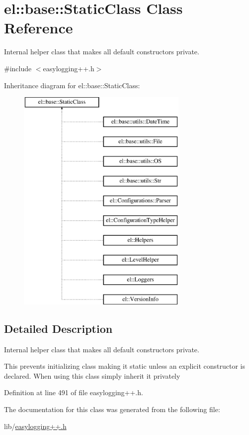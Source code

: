\hypertarget{classel_1_1base_1_1_static_class}{}\section{el\+:\+:base\+:\+:Static\+Class Class Reference}
\label{classel_1_1base_1_1_static_class}


Internal helper class that makes all default constructors private.  




{\ttfamily \#include $<$easylogging++.\+h$>$}

Inheritance diagram for el\+:\+:base\+:\+:Static\+Class\+:\begin{figure}[H]
\begin{center}
\leavevmode
\includegraphics[height=11.000000cm]{classel_1_1base_1_1_static_class}
\end{center}
\end{figure}


\subsection{Detailed Description}
Internal helper class that makes all default constructors private. 

This prevents initializing class making it static unless an explicit constructor is declared. When using this class simply inherit it privately 

Definition at line 491 of file easylogging++.\+h.



The documentation for this class was generated from the following file\+:\begin{DoxyCompactItemize}
\item 
lib/\hyperlink{easylogging_09_09_8h}{easylogging++.\+h}\end{DoxyCompactItemize}
